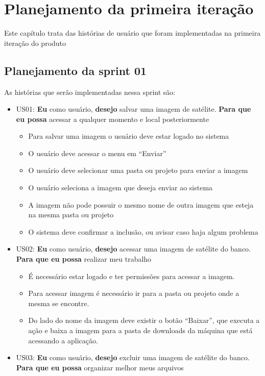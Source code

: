 \chapter{Planejamento da primeira iteração}

  Este capítulo trata das histórias de usuário que foram implementadas na primeira iteração do produto

\section{Planejamento da sprint 01}

  As histórias que serão implementadas nessa sprint são:

   \begin{itemize}
    \item US01: \textbf{Eu} como usuário, \textbf{desejo} salvar uma imagem de satélite. \textbf{Para que eu possa} acessar a qualquer momento e local posteriormente
    \begin{itemize}
    	\item Para salvar uma imagem o usuário deve estar logado no sistema
		\item O usuário deve acessar o menu em “Enviar”
		\item O usuário deve selecionar uma pasta ou projeto para enviar a imagem 
		\item O usuário seleciona a imagem que deseja enviar ao sistema
		\item A imagem não pode possuir o mesmo nome de outra imagem que esteja na mesma pasta ou projeto
		\item O sistema deve confirmar a inclusão, ou avisar caso haja algum problema
    \end{itemize}
    \item US02: \textbf{Eu} como usuário, \textbf{desejo} acessar uma imagem de satélite do banco. \textbf{Para que eu possa} realizar meu trabalho
    \begin{itemize}
    	\item É necessário estar logado e ter permissões para acessar a imagem. 
    	\item Para acessar imagem é necessário ir para a pasta ou projeto onde a mesma se encontre.
    	\item Do lado do nome da imagem deve existir o botão “Baixar”, que executa a ação e baixa a imagem para a pasta de downloads da máquina que está acessando a aplicação.
    \end{itemize}
    \item US03: \textbf{Eu} como usuário, \textbf{desejo} excluir uma imagem de satélite do banco. \textbf{Para que eu possa} organizar melhor meus arquivos

\end{itemize}
